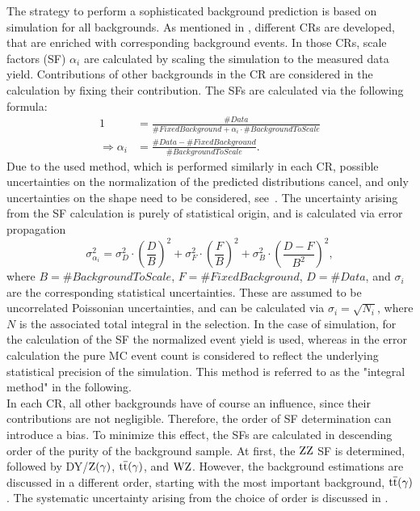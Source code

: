 The strategy to perform a sophisticated background prediction is based on simulation for all backgrounds. As mentioned in , different CRs are developed, that are enriched with corresponding background events. In those CRs, scale factors (SF) $\alpha_i$ are calculated by scaling the simulation to the measured data yield. Contributions of other backgrounds in the CR are considered in the calculation by fixing their contribution. The SFs are calculated via the following formula:
\begin{align}
 1                        & = \frac{\#Data}{\#FixedBackground+\alpha_i\cdot\#BackgroundToScale} \\
 \Longrightarrow \alpha_i & = \frac{\#Data-\#FixedBackground}{\#BackgroundToScale}.             
\end{align}
Due to the used method, which is performed similarly in each CR, possible uncertainties on the normalization of the predicted distributions cancel, and only uncertainties on the shape need to be considered, see~. The uncertainty arising from the SF calculation is purely of statistical origin, and is calculated via error propagation
\begin{equation}
 \sigma_{\alpha_i}^2 = \sigma_{D}^2 \cdot \left(\frac{D}{B}\right)^2 + \sigma_{F}^2 \cdot \left(\frac{F}{B}\right)^2 + \sigma_{B}^2 \cdot \left(\frac{D-F}{B^2}\right)^2,
\end{equation}
where $B=\#BackgroundToScale$, $F=\#FixedBackground$, $D=\#Data$, and $\sigma_i$ are the corresponding statistical uncertainties. These are assumed to be uncorrelated Poissonian uncertainties, and can be calculated via $\sigma_i=\sqrt{N_i}$, where $N$ is the associated total integral in the selection. In the case of simulation, for the calculation of the SF the normalized event yield is used, whereas in the error calculation the pure MC event count is considered to reflect the underlying statistical precision of the simulation. This method is referred to as the "integral method" in the following.\\
In each CR, all other backgrounds have of course an influence, since their contributions are not negligible. Therefore, the order of SF determination can introduce a bias. To minimize this effect, the SFs are calculated in descending order of the purity of the background sample. At first, the $\mathrm{Z}\mathrm{Z}$ SF is determined, followed by DY/$\mathrm{Z}(\gamma)$, ${\mathrm{t}\overline{\mathrm{t}}}(\gamma)$, and $\mathrm{W}\mathrm{Z}$. However, the background estimations are discussed in a different order, starting with the most important background, ${\mathrm{t}\overline{\mathrm{t}}}(\gamma)$. The systematic uncertainty arising from the choice of order is discussed in .\\
